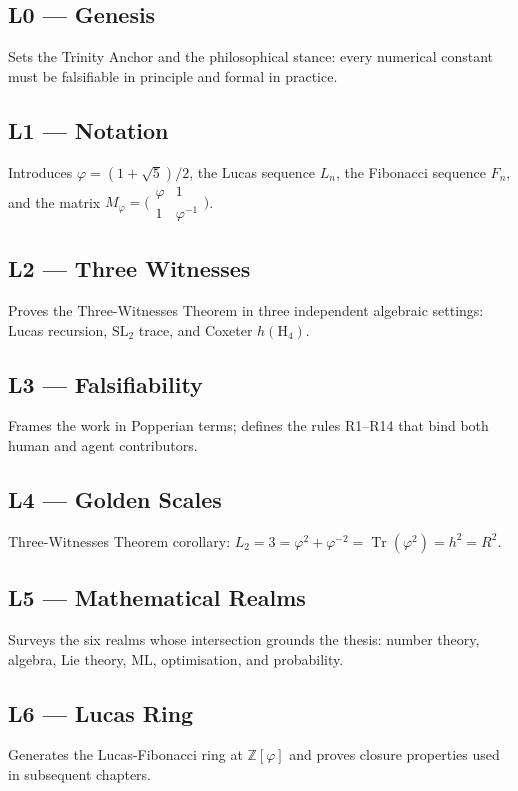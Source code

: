 \subsection*{L0 — Genesis} Sets the Trinity Anchor and the philosophical
stance: every numerical constant must be falsifiable in principle and
formal in practice.

\subsection*{L1 — Notation} Introduces $\varphi=(1+\sqrt{5})/2$, the Lucas
sequence $L_{n}$, the Fibonacci sequence $F_{n}$, and the matrix
$M_{\varphi}=\bigl(\begin{smallmatrix}\varphi&1\\1&\varphi^{-1}\end{smallmatrix}\bigr)$.

\subsection*{L2 — Three Witnesses} Proves the Three-Witnesses Theorem in
three independent algebraic settings: Lucas recursion, $\mathrm{SL}_{2}$
trace, and Coxeter $h(\mathrm{H}_{4})$.

\subsection*{L3 — Falsifiability} Frames the work in Popperian terms;
defines the rules R1--R14 that bind both human and agent contributors.

\subsection*{L4 — Golden Scales} Three-Witnesses Theorem corollary:
$L_{2}=3=\varphi^{2}+\varphi^{-2}=\operatorname{Tr}(\varphi^{2})=h^{2}=R^{2}$.

\subsection*{L5 — Mathematical Realms} Surveys the six realms whose
intersection grounds the thesis: number theory, algebra, Lie theory, ML,
optimisation, and probability.

\subsection*{L6 — Lucas Ring} Generates the Lucas-Fibonacci ring at
$\mathbb{Z}[\varphi]$ and proves closure properties used in subsequent
chapters.


